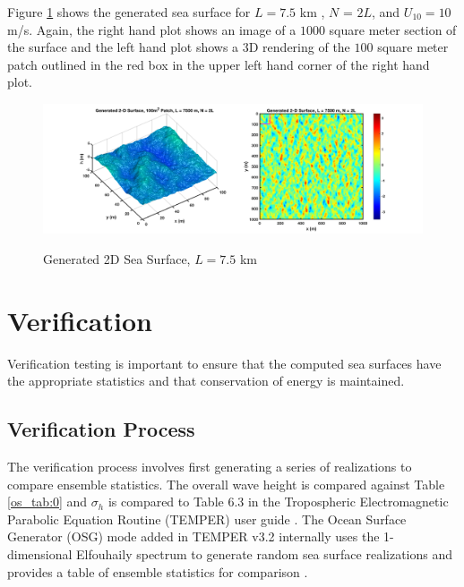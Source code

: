 Figure \ref{os_fig:12} shows the generated sea surface for $L = 7.5$ km , $N$ = $2L$, and $U_{10} = 10$ m/s. Again, the right hand plot shows an image of a $1000$ square meter section of the surface and the left hand plot shows a 3D rendering of the $100$ square meter patch outlined in the red box in the upper left hand corner of the right hand plot.

\begin{figure}[ht]
  \begin{center}
\includegraphics[width=6in]{../media/Ocean_Surface/sea_surface_2d_surf_7500.png}
  \end{center}
  \renewcommand{\baselinestretch}{1} \small\normalsize
  \begin{quote}
    \caption[Generated 2D Sea Surface, $L = 7.5$ km]{Generated 2D Sea Surface, $L = 7.5$ km \label{os_fig:12}}
  \end{quote}
\end{figure}
\renewcommand{\baselinestretch}{2} \small\normalsize

\section {Verification}
Verification testing is important to ensure that the computed sea surfaces have the appropriate statistics and that conservation of energy is maintained.

\subsection {Verification Process}
The verification process involves first generating a series of realizations to compare ensemble statistics. The overall wave height is compared against Table \ref{os_tab:0} and $\sigma_h$ is compared to Table 6.3 in the Tropospheric Electromagnetic Parabolic Equation Routine (TEMPER) user guide \cite{temper_guide}. The Ocean Surface Generator (OSG) mode added in TEMPER v3.2 internally uses the 1-dimensional Elfouhaily spectrum to generate random sea surface realizations and provides a table of ensemble statistics for comparison \cite{temper_guide}. 

